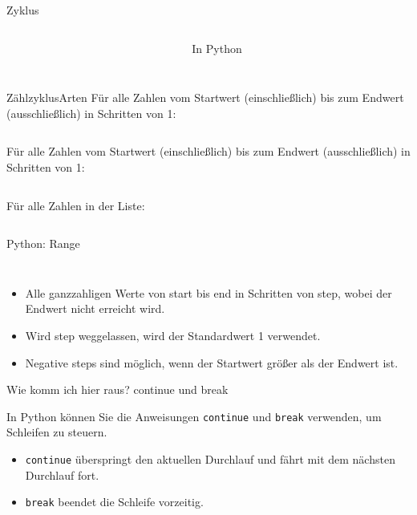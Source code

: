 \documentclass[xelatex,aspectratio=169]{beamer}
\begin{document}
\begin{frame}{Zyklus}
\begin{columns}[t]
\begin{column}{.3\linewidth}
    \end{column}
    \begin{column}{.4\linewidth}
      \begin{block}{In Python}
        \inputminted{python}{src/algorithmus_zyklus.py}
      \end{block}

    \end{column}
  \end{columns}

\end{frame}

\begin{frame}{Zählzyklus}{Arten}
  Für alle Zahlen vom Startwert (einschließlich) bis zum Endwert (ausschließlich) in Schritten von 1:
  \inputminted{python}{src/algorithmus_zaehlzyklus_range.py}

  Für alle Zahlen vom Startwert (einschließlich) bis zum Endwert (ausschließlich) in Schritten von 1:
  \inputminted{python}{src/algorithmus_zaehlzyklus_while.py}

  Für alle Zahlen in der Liste:
  \inputminted{python}{src/algorithmus_zaehlzyklus_list.py}
\end{frame}

\begin{frame}{Python: Range}
  \inputminted{python}{src/algorithmus_zaehlzyklus_range.py}

  \inputminted{python}{src/algorithmus_zaehlzyklus_range_step.py}

  \begin{itemize}
    \item Alle ganzzahligen Werte von start bis end in Schritten von step, wobei der Endwert nicht erreicht wird.
    \item Wird step weggelassen, wird der Standardwert 1 verwendet.
    \item Negative steps sind möglich, wenn der Startwert größer als der Endwert ist.
  \end{itemize}
\end{frame}

\begin{frame}{Wie komm ich hier raus? continue und break}

  In Python können Sie die Anweisungen \texttt{continue} und \texttt{break} verwenden, um Schleifen zu steuern.
  \begin{itemize}
    \item \texttt{continue} überspringt den aktuellen Durchlauf und fährt mit dem nächsten Durchlauf fort.
    \item \texttt{break} beendet die Schleife vorzeitig.
  \end{itemize}

  \inputminted{python}{src/algorithmus_break_continue.py}
\end{frame}


\end{document}
